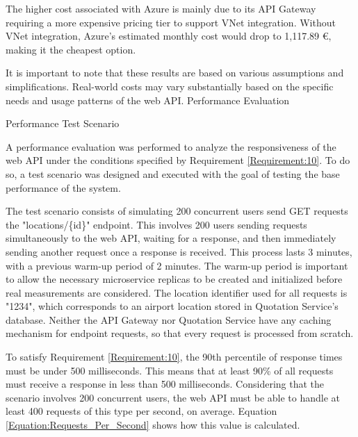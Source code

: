 \documentclass[12pt, reqno]{amsbook}
\makeatletter
\def\section{\@startsection{section}{1}%
      \z@{.5\linespacing\@plus.7\linespacing}{.25\linespacing}%
      {\normalfont\bfseries\flushleft}}
\def\subsection{\@startsection{subsection}{2}%
      \z@{.5\linespacing\@plus.7\linespacing}{.25\linespacing}%
      {\normalfont\bfseries\flushleft}}
\theoremstyle{definition}
\theoremstyle{definition}
\numberwithin{section}{chapter}
\numberwithin{table}{chapter}
\numberwithin{figure}{chapter}
\makeatother
\begin{document}
The higher cost associated with Azure is mainly due to its \ac{API} Gateway requiring a more expensive pricing tier to support \ac{VNet} integration. Without \ac{VNet} integration, Azure's estimated monthly cost would drop to 1,117.89 \euro, making it the cheapest option.

It is important to note that these results are based on various assumptions and simplifications. Real-world costs may vary substantially based on the specific needs and usage patterns of the web \ac{API}.
\section{Performance Evaluation}
\label{Section:Performance_Evaluation}

\subsection{Performance Test Scenario}
\label{Subsection:Performance_Test_Scenario}

A performance evaluation was performed to analyze the responsiveness of the web \ac{API} under the conditions specified by Requirement \ref{Requirement:10}. To do so, a test scenario was designed and executed with the goal of testing the base performance of the system.

The test scenario consists of simulating 200 concurrent users send GET requests the "locations/\{id\}" endpoint. This involves 200 users sending requests simultaneously to the web \ac{API}, waiting for a response, and then immediately sending another request once a response is received. This process lasts 3 minutes, with a previous warm-up period of 2 minutes. The warm-up period is important to allow the necessary microservice replicas to be created and initialized before real measurements are considered. The location identifier used for all requests is "1234", which corresponds to an airport location stored in Quotation Service's database. Neither the \ac{API} Gateway nor Quotation Service have any caching mechanism for endpoint requests, so that every request is processed from scratch.

To satisfy Requirement \ref{Requirement:10}, the 90th percentile of response times must be under 500 milliseconds. This means that at least 90\% of all requests must receive a response in less than 500 milliseconds. Considering that the scenario involves 200 concurrent users, the web \ac{API} must be able to handle at least 400 requests of this type per second, on average. Equation \ref{Equation:Requests_Per_Second} shows how this value is calculated.
\end{document}

